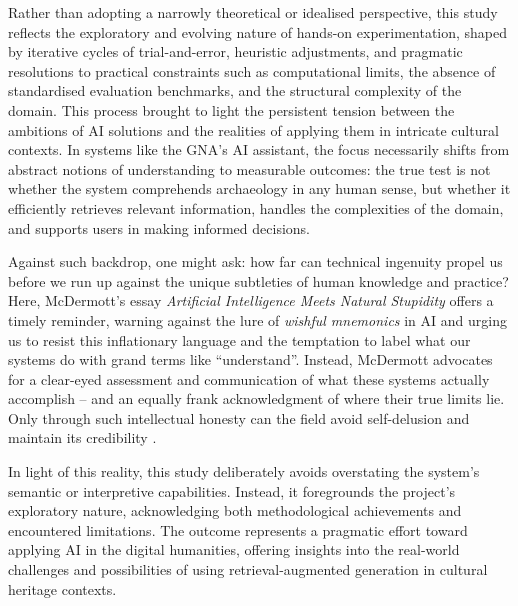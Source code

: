 \begin{spacing}{1.5}
Rather than adopting a narrowly theoretical or idealised perspective, this study reflects the exploratory and evolving nature of hands-on experimentation, shaped by iterative cycles of trial-and-error, heuristic adjustments, and pragmatic resolutions to practical constraints such as computational limits, the absence of standardised evaluation benchmarks, and the structural complexity of the domain. This process brought to light the persistent tension between the ambitions of AI solutions and the realities of applying them in intricate cultural contexts. In systems like the GNA’s AI assistant, the focus necessarily shifts from abstract notions of understanding to measurable outcomes: the true test is not whether the system comprehends archaeology in any human sense, but whether it efficiently retrieves relevant information, handles the complexities of the domain, and supports users in making informed decisions. 

Against such backdrop, one might ask: how far can technical ingenuity propel us before we run up against the unique subtleties of human knowledge and practice? Here, McDermott’s essay \textit{Artificial Intelligence Meets Natural Stupidity} offers a timely reminder, warning against the lure of \textit{wishful mnemonics} in AI and urging us to resist this inflationary language and the temptation to label what our systems do with grand terms like ``understand''. Instead, McDermott advocates for a clear-eyed assessment and communication of what these systems actually accomplish -- and an equally frank acknowledgment of where their true limits lie. Only through such intellectual honesty can the field avoid self-delusion and maintain its credibility \citep{mcdermott_artificial_1976}.

In light of this reality, this study deliberately avoids overstating the system’s semantic or interpretive capabilities. Instead, it foregrounds the project’s exploratory nature, acknowledging both methodological achievements and encountered limitations. The outcome represents a pragmatic effort toward applying AI in the digital humanities, offering insights into the real-world challenges and possibilities of using retrieval-augmented generation in cultural heritage contexts.

\end{spacing}